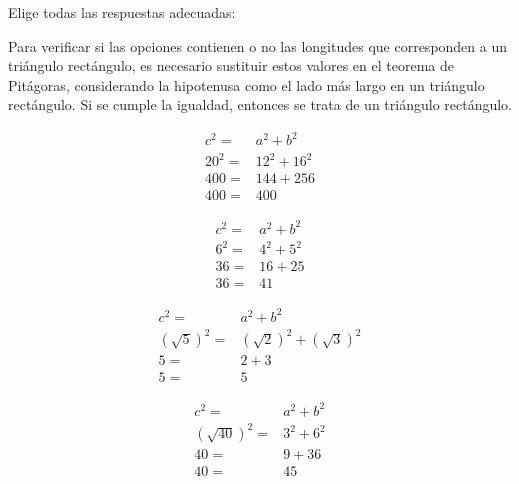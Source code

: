 Elige todas las respuestas adecuadas:

\begin{solutionbox}{6cm}
    Para verificar si las opciones contienen o no las longitudes que corresponden a un triángulo rectángulo, es necesario sustituir estos valores en el teorema de Pitágoras, considerando la hipotenusa como el lado más largo en un triángulo rectángulo. Si se cumple la igualdad, entonces se trata de un triángulo rectángulo.

    \begin{multicols}{4}
        \begin{align*}
            c^2=  & a^2+b^2   \\
            20^2= & 12^2+16^2 \\
            400=  & 144+256   \\
            400=  & 400
        \end{align*}

        \begin{align*}
            c^2= & a^2+b^2 \\
            6^2= & 4^2+5^2 \\
            36=  & 16+25   \\
            36=  & 41
        \end{align*}

        \begin{align*}
            c^2=          & a^2+b^2                     \\
            (\sqrt{5})^2= & (\sqrt{2})^2 + (\sqrt{3})^2 \\
            5=            & 2+3                         \\
            5=            & 5
        \end{align*}

        \begin{align*}
            c^2=           & a^2+b^2   \\
            (\sqrt{40})^2= & 3^2 + 6^2 \\
            40=            & 9+36      \\
            40=            & 45
        \end{align*}
    \end{multicols}
\end{solutionbox}